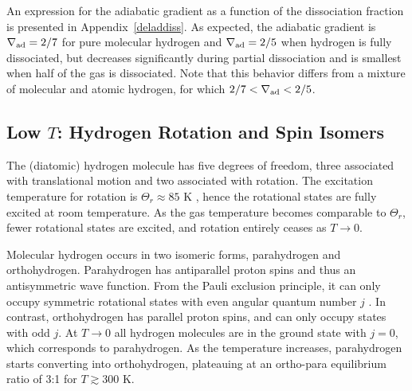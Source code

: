 \documentclass[apj]{emulateapj}
\newcommand{\delad}{\nabla_{\rm ad}}
\newcommand{\App}[1]{Appendix~\ref{#1}}
\begin{document}

An expression for the adiabatic gradient as a function of the dissociation fraction is presented in \App{deladdiss}. As expected, the adiabatic gradient is $\delad=2/7$ for pure molecular hydrogen and $\delad=2/5$ when hydrogen is fully dissociated, but decreases significantly during partial dissociation and is smallest when half of the gas is dissociated. Note that this behavior differs from a mixture of molecular and atomic hydrogen, for which $2/7<\delad<2/5$. %







\subsection{Low $T$: Hydrogen Rotation and Spin Isomers}

The (diatomic) hydrogen molecule has five degrees of freedom, three associated with translational motion and two associated with rotation. The excitation temperature for rotation is $\Theta_r \approx 85$ K \citep{kittel}, hence the rotational states are fully excited at room temperature. As the gas temperature becomes comparable to $\Theta_r$, fewer rotational states are excited, and rotation entirely ceases as $T \rightarrow 0$. %

 Molecular hydrogen occurs in two isomeric forms, parahydrogen and orthohydrogen. Parahydrogen has antiparallel proton spins and thus an antisymmetric wave function. From the Pauli exclusion principle, it can only occupy symmetric rotational states with even angular quantum number $j$ \citep{farkas35}. In contrast, orthohydrogen has parallel proton spins, and can only occupy states with odd $j$. At $T \rightarrow 0$ all hydrogen molecules are in the ground state with $j=0$, which corresponds to parahydrogen.  As the temperature increases, parahydrogen starts converting into orthohydrogen, plateauing at an ortho-para equilibrium ratio of 3:1 for $T \gtrsim 300$ K.
 
\end{document}
